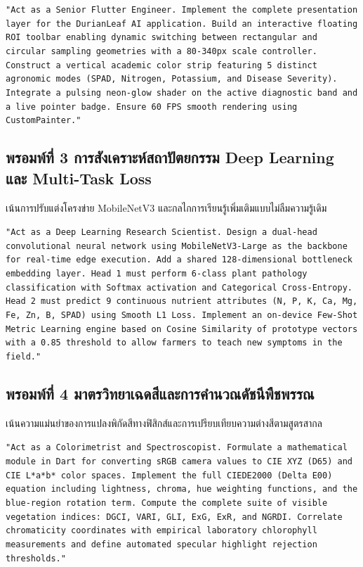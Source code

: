 \begin{promptbox}[title={พรอมพ์ที่ 2 การพัฒนาแอปพลิเคชันและ UI/UX แถบสีวิชาการ}]
\texttt{"Act as a Senior Flutter Engineer. Implement the complete presentation layer for the DurianLeaf AI application. Build an interactive floating ROI toolbar enabling dynamic switching between rectangular and circular sampling geometries with a 80-340px scale controller. Construct a vertical academic color strip featuring 5 distinct agronomic modes (SPAD, Nitrogen, Potassium, and Disease Severity). Integrate a pulsing neon-glow shader on the active diagnostic band and a live pointer badge. Ensure 60 FPS smooth rendering using CustomPainter."}
\end{promptbox}

\subsection{พรอมพ์ที่ 3 การสังเคราะห์สถาปัตยกรรม Deep Learning และ Multi-Task Loss}
เน้นการปรับแต่งโครงข่าย MobileNetV3 และกลไกการเรียนรู้เพิ่มเติมแบบไม่ลืมความรู้เดิม

\begin{promptbox}[title={พรอมพ์ที่ 3 สถาปัตยกรรม Deep Learning และ Few-Shot Learning}]
\texttt{"Act as a Deep Learning Research Scientist. Design a dual-head convolutional neural network using MobileNetV3-Large as the backbone for real-time edge execution. Add a shared 128-dimensional bottleneck embedding layer. Head 1 must perform 6-class plant pathology classification with Softmax activation and Categorical Cross-Entropy. Head 2 must predict 9 continuous nutrient attributes (N, P, K, Ca, Mg, Fe, Zn, B, SPAD) using Smooth L1 Loss. Implement an on-device Few-Shot Metric Learning engine based on Cosine Similarity of prototype vectors with a 0.85 threshold to allow farmers to teach new symptoms in the field."}
\end{promptbox}

\subsection{พรอมพ์ที่ 4 มาตรวิทยาเฉดสีและการคำนวณดัชนีพืชพรรณ}
เน้นความแม่นยำของการแปลงพิกัดสีทางฟิสิกส์และการเปรียบเทียบความต่างสีตามสูตรสากล

\begin{promptbox}[title={พรอมพ์ที่ 4 วิทยาศาสตร์เฉดสีและการเปรียบเทียบ CIEDE2000}]
\texttt{"Act as a Colorimetrist and Spectroscopist. Formulate a mathematical module in Dart for converting sRGB camera values to CIE XYZ (D65) and CIE L*a*b* color spaces. Implement the full CIEDE2000 (Delta E00) equation including lightness, chroma, hue weighting functions, and the blue-region rotation term. Compute the complete suite of visible vegetation indices: DGCI, VARI, GLI, ExG, ExR, and NGRDI. Correlate chromaticity coordinates with empirical laboratory chlorophyll measurements and define automated specular highlight rejection thresholds."}
\end{promptbox}

